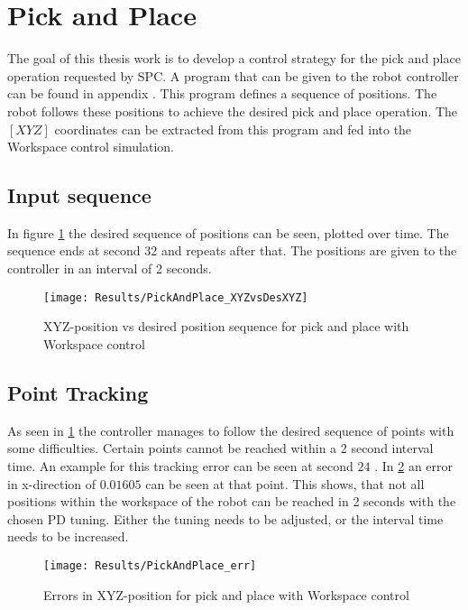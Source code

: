 
\section{Pick and Place}
The goal of this thesis work is to develop a control strategy for the pick and place operation requested by SPC. A program that can be given to the robot controller can be found in appendix .
This program defines a sequence of positions. The robot follows these positions to achieve the desired pick and place operation.
The $ [XYZ] $ coordinates can be extracted from this program and fed into the Workspace control simulation.

\subsection{Input sequence}
In figure \ref{fig:PickAndPlace_XYZvsDesXYZ} the desired sequence of positions can be seen, plotted over time. The sequence ends at second $32$ and repeats after that. The positions are given to the controller in an interval of 2 seconds.

\begin{figure}[H]
	\texttt{[image: Results/PickAndPlace\_XYZvsDesXYZ]}
	\caption{XYZ-position vs desired position sequence for pick and place with Workspace control}
	\label{fig:PickAndPlace_XYZvsDesXYZ}
\end{figure}


\subsection{Point Tracking}
As seen in \cref{fig:PickAndPlace_XYZvsDesXYZ} the controller manages to follow the desired sequence of points with some difficulties. Certain points cannot be reached within a 2 second interval time. An example for this tracking error can be seen at second $24$ . In \cref{fig:PickAndPlace_err} an error in x-direction of $0.01605$ can be seen at that point. 
This shows, that not all positions within the workspace of the robot can be reached in 2 seconds with the chosen PD tuning.
Either the tuning needs to be adjusted, or the interval time needs to be increased.

\begin{figure}[H]
	\texttt{[image: Results/PickAndPlace\_err]}
	\caption{Errors in XYZ-position for pick and place with Workspace control}
	\label{fig:PickAndPlace_err}
\end{figure}



